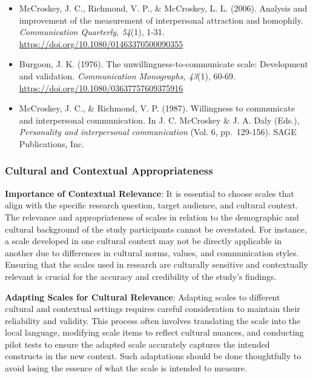 \documentclass[
]{book}
\begin{document}
\begin{itemize}
\item
  McCroskey, J. C., Richmond, V. P., \& McCroskey, L. L. (2006). Analysis and improvement of the measurement of interpersonal attraction and homophily. \emph{Communication Quarterly, 54}(1), 1-31. \url{https://doi.org/10.1080/01463370500090355}
\item
  Burgoon, J. K. (1976). The unwillingness-to-communicate scale: Development and validation. \emph{Communication Monographs, 43}(1), 60-69. \url{https://doi.org/10.1080/03637757609375916}
\item
  McCroskey, J. C., \& Richmond, V. P. (1987). Willingness to communicate and interpersonal communication. In J. C. McCroskey \& J. A. Daly (Eds.), \emph{Personality and interpersonal communication} (Vol. 6, pp.~129-156). SAGE Publications, Inc.
\end{itemize}

\hypertarget{cultural-and-contextual-appropriateness}{%
\subsubsection*{Cultural and Contextual Appropriateness}\label{cultural-and-contextual-appropriateness}}

\textbf{Importance of Contextual Relevance}: It is essential to choose scales that align with the specific research question, target audience, and cultural context. The relevance and appropriateness of scales in relation to the demographic and cultural background of the study participants cannot be overstated. For instance, a scale developed in one cultural context may not be directly applicable in another due to differences in cultural norms, values, and communication styles. Ensuring that the scales used in research are culturally sensitive and contextually relevant is crucial for the accuracy and credibility of the study's findings.

\textbf{Adapting Scales for Cultural Relevance}: Adapting scales to different cultural and contextual settings requires careful consideration to maintain their reliability and validity. This process often involves translating the scale into the local language, modifying scale items to reflect cultural nuances, and conducting pilot tests to ensure the adapted scale accurately captures the intended constructs in the new context. Such adaptations should be done thoughtfully to avoid losing the essence of what the scale is intended to measure.
\end{document}

